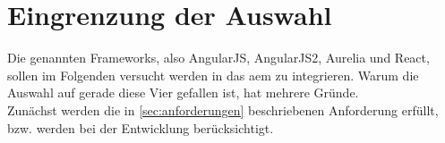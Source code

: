 \section{Eingrenzung der Auswahl}
Die genannten Frameworks, also AngularJS, AngularJS2, Aurelia und React, sollen im Folgenden versucht werden in das \ac{aem} zu integrieren. Warum die Auswahl auf gerade diese Vier gefallen ist, hat mehrere Gründe. \\
Zunächst werden die in \autoref{sec:anforderungen} beschriebenen Anforderung erfüllt, bzw. werden bei der Entwicklung berücksichtigt. 